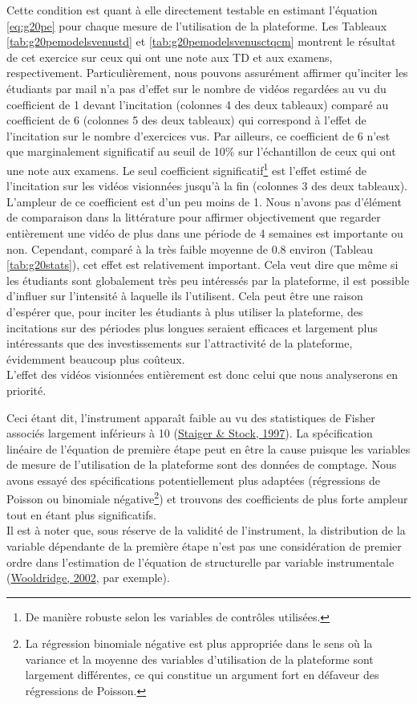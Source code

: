 \documentclass[
]{book}
\begin{document}
Cette condition est quant à elle directement testable en estimant l'équation \eqref{eq:g20pe} pour chaque mesure de l'utilisation de la plateforme. Les Tableaux \ref{tab:g20pemodelsvenustd} et \ref{tab:g20pemodelsvenusctqcm} montrent le résultat de cet exercice sur ceux qui ont une note aux TD et aux examens, respectivement. Particulièrement, nous pouvons assurément affirmer qu'inciter les étudiants par mail n'a pas d'effet sur le nombre de vidéos regardées au vu du coefficient de 1 devant l'incitation (colonnes 4 des deux tableaux) comparé au coefficient de 6 (colonnes 5 des deux tableaux) qui correspond à l'effet de l'incitation sur le nombre d'exercices vus. Par ailleurs, ce coefficient de 6 n'est que marginalement significatif au seuil de 10\% sur l'échantillon de ceux qui ont une note aux examens. Le seul coefficient significatif\footnote{De manière robuste selon les variables de contrôles utilisées.} est l'effet estimé de l'incitation sur les vidéos visionnées jusqu'à la fin (colonnes 3 des deux tableaux). L'ampleur de ce coefficient est d'un peu moins de 1. Nous n'avons pas d'élément de comparaison dans la littérature pour affirmer objectivement que regarder entièrement une vidéo de plus dans une période de 4 semaines est importante ou non. Cependant, comparé à la très faible moyenne de 0.8 environ (Tableau \ref{tab:g20stats}), cet effet est relativement important. Cela veut dire que même si les étudiants sont globalement très peu intéressés par la plateforme, il est possible d'influer sur l'intensité à laquelle ils l'utilisent. Cela peut être une raison d'espérer que, pour inciter les étudiants à plus utiliser la plateforme, des incitations sur des périodes plus longues seraient efficaces et largement plus intéressants que des investissements sur l'attractivité de la plateforme, évidemment beaucoup plus coûteux.\\
L'effet des vidéos visionnées entièrement est donc celui que nous analyserons en priorité.

\quad Ceci étant dit, l'instrument apparaît faible au vu des statistiques de Fisher associés largement inférieurs à 10 (\protect\hyperlink{ref-STA:STO:97}{Staiger \& Stock, 1997}). La spécification linéaire de l'équation de première étape peut en être la cause puisque les variables de mesure de l'utilisation de la plateforme sont des données de comptage. Nous avons essayé des spécifications potentiellement plus adaptées (régressions de Poisson ou binomiale négative\footnote{La régression binomiale négative est plus appropriée dans le sens où la variance et la moyenne des variables d'utilisation de la plateforme sont largement différentes, ce qui constitue un argument fort en défaveur des régressions de Poisson.}) et trouvons des coefficients de plus forte ampleur tout en étant plus significatifs.\\
Il est à noter que, sous réserve de la validité de l'instrument, la distribution de la variable dépendante de la première étape n'est pas une considération de premier ordre dans l'estimation de l'équation de structurelle par variable instrumentale (\protect\hyperlink{ref-WOO:02}{Wooldridge, 2002}, par exemple).
\end{document}
